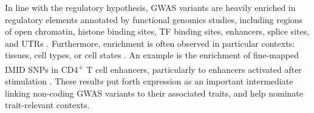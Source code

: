 \begin{outline}
In line with the regulatory hypothesis, \gls{GWAS} variants are heavily enriched in regulatory elements annotated by functional genomics studies, including
    regions of open chromatin, 
    histone binding sites, 
    \gls{TF} binding sites,
    enhancers,
    splice sites,
    and \glspl{UTR}
    \autocite{schaub2012LinkingDiseaseAssociations,maurano2012SystematicLocalizationCommon,farh2015GeneticEpigeneticFine,trynka2015DisentanglingEffectsColocalizing,nasser2020GenomewideMapsEnhancer}.
Furthermore, enrichment is often observed in particular contexts: tissues, cell types, or cell states \autocite{visscher201710YearsGWAS,gallagher2018PostGWASEraAssociation,cano-gamez2020GWASFunctionUsing}.
An example is the enrichment of fine-mapped \gls{IMID} \glspl{SNP} in CD4\textsuperscript{+} T cell enhancers, particularly to enhancers activated after stimulation \autocite{farh2015GeneticEpigeneticFine}.
These results put forth expression as an important intermediate linking non-coding \gls{GWAS} variants to their associated traits, 
and help nominate trait-relevant contexts.


\end{outline}

